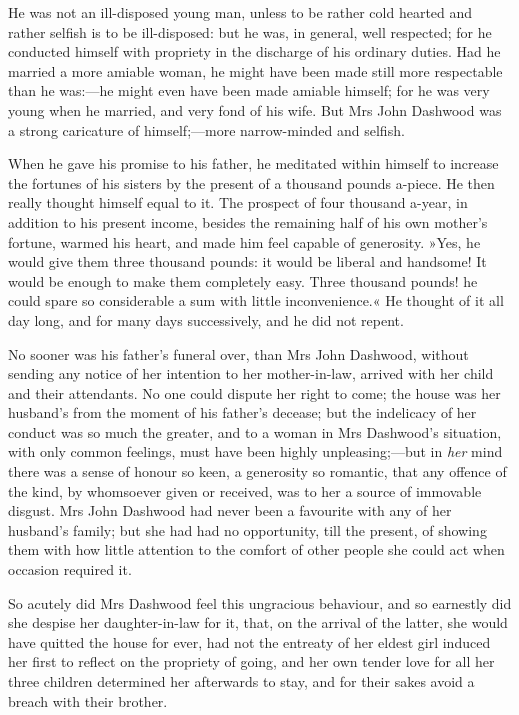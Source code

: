 He was not an ill-disposed young man, unless to be rather cold hearted and rather selfish is to be ill-disposed: but he was, in general, well respected; for he conducted himself with propriety in the discharge of his ordinary duties. Had he married a more amiable woman, he might have been made still more respectable than he was:—he might even have been made amiable himself; for he was very young when he married, and very fond of his wife. But Mrs John Dashwood was a strong caricature of himself;—more narrow-minded and selfish.

When he gave his promise to his father, he meditated within himself to increase the fortunes of his sisters by the present of a thousand pounds a-piece. He then really thought himself equal to it. The prospect of four thousand a-year, in addition to his present income, besides the remaining half of his own mother’s fortune, warmed his heart, and made him feel capable of generosity. »Yes, he would give them three thousand pounds: it would be liberal and handsome! It would be enough to make them completely easy. Three thousand pounds! he could spare so considerable a sum with little inconvenience.« He thought of it all day long, and for many days successively, and he did not repent.

No sooner was his father’s funeral over, than Mrs John Dashwood, without sending any notice of her intention to her mother-in-law, arrived with her child and their attendants. No one could dispute her right to come; the house was her husband’s from the moment of his father’s decease; but the indelicacy of her conduct was so much the greater, and to a woman in Mrs Dashwood’s situation, with only common feelings, must have been highly unpleasing;—but in \textit{her} mind there was a sense of honour so keen, a generosity so romantic, that any offence of the kind, by whomsoever given or received, was to her a source of immovable disgust. Mrs John Dashwood had never been a favourite with any of her husband’s family; but she had had no opportunity, till the present, of showing them with how little attention to the comfort of other people she could act when occasion required it.

So acutely did Mrs Dashwood feel this ungracious behaviour, and so earnestly did she despise her daughter-in-law for it, that, on the arrival of the latter, she would have quitted the house for ever, had not the entreaty of her eldest girl induced her first to reflect on the propriety of going, and her own tender love for all her three children determined her afterwards to stay, and for their sakes avoid a breach with their brother.

